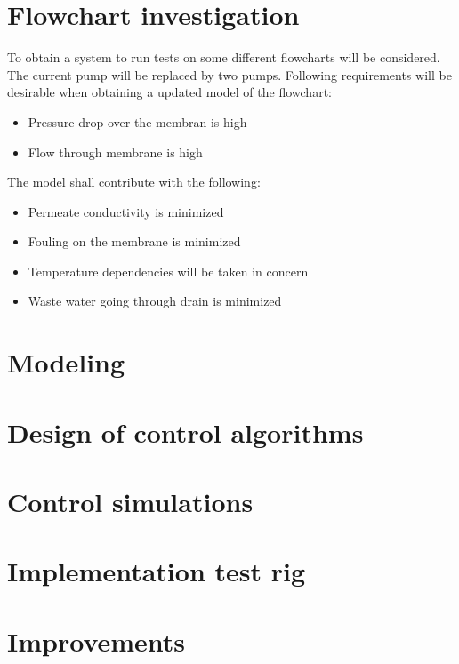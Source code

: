 
\section{Flowchart investigation}
To obtain a system to run tests on some different flowcharts will be considered. The current pump will be replaced by two pumps. Following requirements will be desirable when obtaining a updated model of the flowchart:
\begin{itemize}
\renewcommand\labelitemi{-}
\item Pressure drop over the membran is high
\item Flow through membrane is high
\end{itemize}
The model shall contribute with the following:
\begin{itemize}
\renewcommand\labelitemi{-}
\item Permeate conductivity is minimized
\item Fouling on the membrane is minimized
\item Temperature dependencies will be taken in concern
\item Waste water going through drain is minimized
\end{itemize}




\section{Modeling}


\section{Design of control algorithms}

\section{Control simulations}

\section{Implementation test rig}

\section{Improvements}

